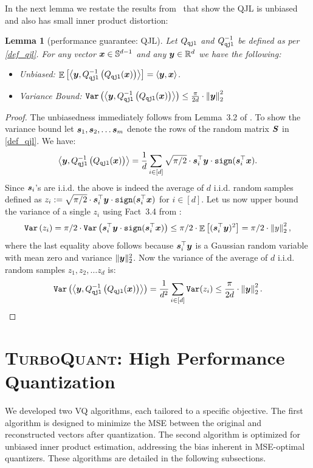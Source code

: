 \documentclass[11pt]{article}
\newtheorem{lemma}{Lemma}
\newcommand{\TurboQuant}{\textsc{TurboQuant}\xspace}
\begin{document}
In the next lemma we restate the results from~\cite{qjl} that show the QJL is unbiased and also has small inner product distortion:
\begin{lemma}[performance guarantee: QJL]\label{lem_qjl}
Let $Q_{\tt qjl}$ and $Q_{\tt qjl}^{-1}$ be defined as per \cref{def_qjl}. 
For any vector $\x \in \SS^{d-1}$ and any $\y \in \RR^d$ we have the following:
\begin{itemize}
    \item Unbiased: $\E\left[ \left< \y, Q_{\tt qjl}^{-1}\left( Q_{\tt qjl}(\x) \right) \right> \right] = \langle \y, \x \rangle$.
    \item Variance Bound: $\mathtt{Var} \left( \left< \y, Q_{\tt qjl}^{-1}\left( Q_{\tt qjl}(\x) \right) \right> \right) \le \frac{\pi}{2 d} \cdot \norm{\y}_2^2$
\end{itemize}
\end{lemma}
\begin{proof}
The unbiasedness immediately follows from Lemma~3.2 of \cite{qjl}.
To show the variance bound let $\s_1, \s_2, \ldots \s_m$ denote the rows of the random matrix $\S$ in \cref{def_qjl}. We have:
    \[
    \left< \y, Q_{\tt qjl}^{-1}\left( Q_{\tt qjl}(\x) \right) \right> = \frac{1}{d} \sum_{i\in[d]} \sqrt{\pi/2} \cdot \s_i^\top \y \cdot {\tt sign}(\s_i^\top \x).
    \]
    Since $\s_i$'s are i.i.d. the above is indeed the average of $d$ i.i.d. random samples defined as $z_i := \sqrt{\pi/2} \cdot \s_i^\top \y \cdot {\tt sign}(\s_i^\top \x)$ for $i \in [d]$.
    Let us now upper bound the variance of a single $z_i$ using Fact~3.4 from \cite{qjl}:
    \begin{equation}\label{eq_moments_estimator}
    \mathtt{Var} \left( z_i \right) = \pi/2 \cdot \mathtt{Var} \left( \s_i^\top \y \cdot {\tt sign}(\s_i^\top \x) \right) \le \pi/2 \cdot \E \left[ (\s_i^\top \y)^2 \right] = \pi/2 \cdot \norm{y}_2^2,
    \end{equation}
    where the last equality above follows because $\s_i^\top \y$ is a Gaussian random variable with mean zero and variance $\|\y\|_2^2$.
    Now the variance of the average of $d$ i.i.d. random samples $z_1, z_2, \ldots z_d$ is:
    \[
    \mathtt{Var} \left( \left< \y, Q_{\tt qjl}^{-1}\left( Q_{\tt qjl}(\x) \right) \right> \right) = \frac{1}{d^2} \sum_{i\in[d]} \mathtt{Var} ( z_i ) \le \frac{\pi}{2 d} \cdot \norm{\y}_2^2.
    \]
\end{proof}

\section{\TurboQuant: High Performance Quantization}
We developed two VQ algorithms, each tailored to a specific objective. 
The first algorithm is designed to minimize the MSE between the original and reconstructed vectors after quantization. 
The second algorithm is optimized for unbiased inner product estimation, addressing the bias inherent in MSE-optimal quantizers. 
These algorithms are detailed in the following subsections.
\end{document}

